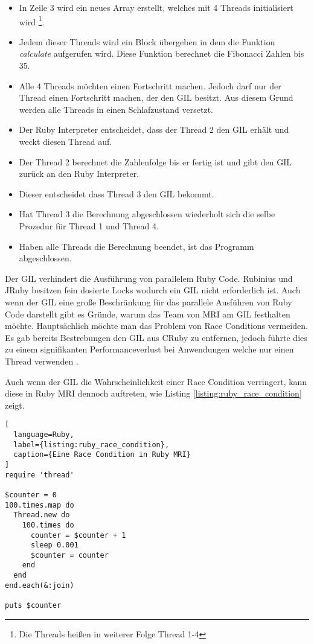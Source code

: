 \begin{itemize}
  \item In Zeile 3 wird ein neues Array erstellt, welches mit 4 Threads initialisiert wird \footnote{Die Threads heißen in weiterer Folge Thread 1-4}.
  \item Jedem dieser Threads wird ein Block übergeben in dem die Funktion \emph{calculate} aufgerufen wird. Diese Funktion berechnet die Fibonacci Zahlen bis 35.
  \item Alle 4 Threads möchten einen Fortschritt machen. Jedoch darf nur der Thread einen Fortschritt machen, der den GIL besitzt. Aus diesem Grund werden alle Threads in einen Schlafzustand versetzt.
  \item Der Ruby Interpreter entscheidet, dass der Thread 2 den GIL erhält und weckt diesen Thread auf.
  \item Der Thread 2 berechnet die Zahlenfolge bis er fertig ist und gibt den GIL zurück an den Ruby Interpreter.
  \item Dieser entscheidet dass Thread 3 den GIL bekommt.
  \item Hat Thread 3 die Berechnung abgeschlossen wiederholt sich die selbe Prozedur für Thread 1 und Thread 4.
  \item Haben alle Threads die Berechnung beendet, ist das Programm abgeschlossen.
\end{itemize}

Der GIL verhindert die Ausführung von parallelem Ruby Code. Rubinius und JRuby besitzen fein dosierte Locks wodurch ein GIL nicht erforderlich ist. Auch wenn der GIL eine große Beschränkung für das parallele Ausführen von Ruby Code darstellt gibt es Gründe, warum das Team von MRI am GIL festhalten möchte. Hauptsächlich möchte man das Problem von Race Conditions vermeiden. Es gab bereits Bestrebungen den GIL aus CRuby zu entfernen, jedoch führte dies zu einem signifikanten Performanceverlust bei Anwendungen welche nur einen Thread verwenden \cite[p. 48-49]{Sto2013}.

Auch wenn der GIL die Wahrscheinlichkeit einer Race Condition verringert, kann diese in Ruby MRI dennoch auftreten, wie Listing \ref{listing:ruby_race_condition} zeigt.

\begin{lstlisting}[
  language=Ruby,
  label={listing:ruby_race_condition},
  caption={Eine Race Condition in Ruby MRI}
]
require 'thread'

$counter = 0
100.times.map do
  Thread.new do
    100.times do
      counter = $counter + 1
      sleep 0.001
      $counter = counter
    end
  end
end.each(&:join)

puts $counter
\end{lstlisting}


